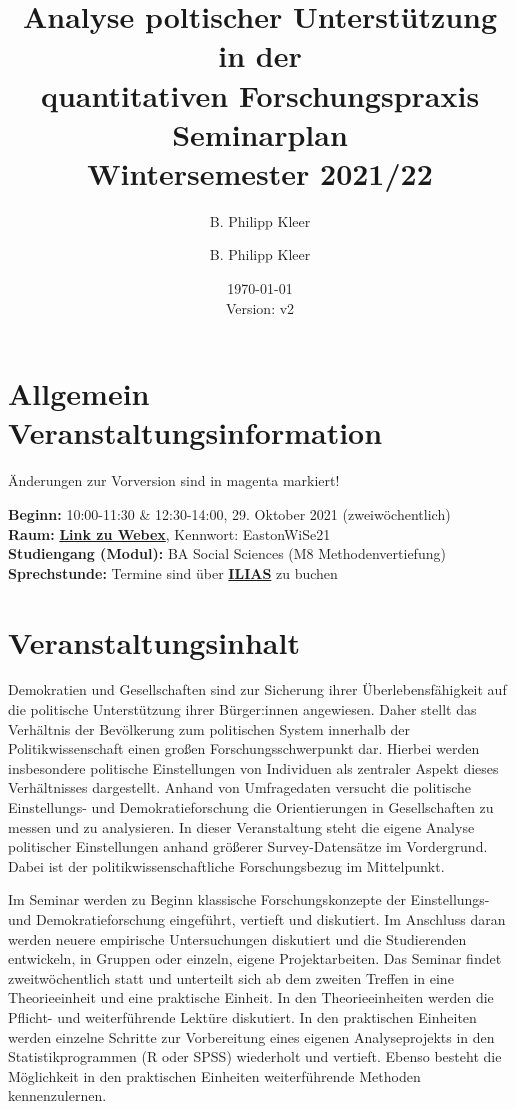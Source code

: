 \documentclass[11pt,a4paper]{article}
\author{B. Philipp Kleer}
\title{%
  Analyse poltischer Unterstützung in der\\quantitativen Forschungspraxis \\
  \large Seminarplan \\
  Wintersemester 2021/22}
\author{B. Philipp Kleer}
\date{\today \\ \small{Version: v2}}
\begin{document}
\maketitle

\section*{Allgemein Veranstaltungsinformation}

{\color{magenta}Änderungen zur Vorversion sind in magenta markiert!}

\textbf{Beginn:} 10:00-11:30 \& 12:30-14:00, 29. Oktober 2021 (zweiwöchentlich) \\
\textbf{Raum:} \href{https://uni-giessen.webex.com/uni-giessen/j.php?MTID=md4723c890a79880413a03711535386ad}{\textbf{Link zu Webex}}, Kennwort: EastonWiSe21  \\
\textbf{Studiengang (Modul):} BA Social Sciences (M8 Methodenvertiefung)\\
\textbf{Sprechstunde:} Termine sind über \href{https://ilias.uni-giessen.de/ilias/goto.php?target=prtf_415969_35654&client_id=JLUG}{\textbf{ILIAS}} zu buchen

\section*{Veranstaltungsinhalt}

Demokratien und Gesellschaften sind zur Sicherung ihrer Überlebensfähigkeit auf die politische Unterstützung ihrer Bürger:innen angewiesen. Daher stellt das Verhältnis der Bevölkerung zum politischen System innerhalb der Politikwissenschaft einen großen Forschungsschwerpunkt dar. Hierbei werden insbesondere politische Einstellungen von Individuen als zentraler Aspekt dieses Verhältnisses dargestellt. Anhand von Umfragedaten versucht die politische Einstellungs- und Demokratieforschung die Orientierungen in Gesellschaften zu messen und zu analysieren. In dieser Veranstaltung steht die eigene Analyse politischer Einstellungen anhand größerer Survey-Datensätze im Vordergrund. Dabei ist der politikwissenschaftliche Forschungsbezug im Mittelpunkt. 

Im Seminar werden zu Beginn klassische Forschungskonzepte der Einstellungs- und Demokratieforschung eingeführt, vertieft und diskutiert. Im Anschluss daran werden neuere empirische Untersuchungen diskutiert und die Studierenden entwickeln, in Gruppen oder einzeln, eigene Projektarbeiten. Das Seminar findet zweitwöchentlich statt und unterteilt sich ab dem zweiten Treffen in eine Theorieeinheit und eine praktische Einheit. In den Theorieeinheiten werden die Pflicht- und weiterführende Lektüre diskutiert. In den praktischen Einheiten werden einzelne Schritte zur Vorbereitung eines eigenen Analyseprojekts in den Statistikprogrammen (R oder SPSS) wiederholt und vertieft. Ebenso besteht die Möglichkeit in den praktischen Einheiten weiterführende Methoden kennenzulernen.
\end{document}
